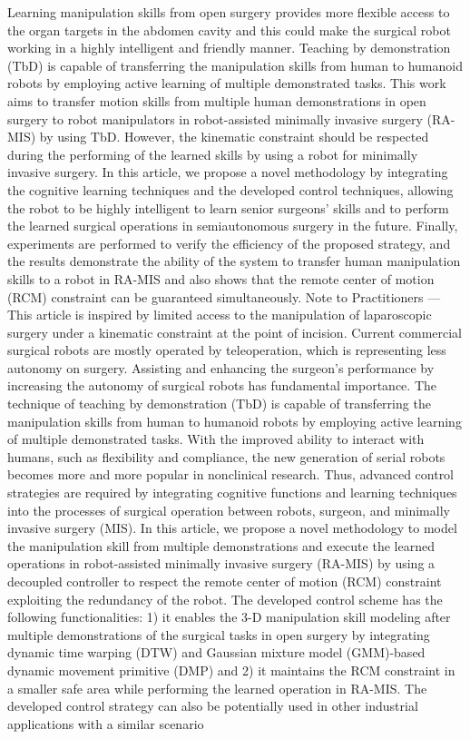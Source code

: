 \documentclass[conference]{IEEEtran}
\begin{document}
Learning manipulation skills from open surgery provides more flexible access to the organ targets in the abdomen cavity and this could make the surgical robot working in a highly intelligent and friendly manner. Teaching by demonstration (TbD) is capable of transferring the manipulation skills from human to humanoid robots by employing active learning of multiple demonstrated tasks. This work aims to transfer motion skills from multiple human demonstrations in open surgery to robot manipulators in robot-assisted minimally invasive surgery (RA-MIS) by using TbD. However, the kinematic constraint should be respected during the performing of the learned skills by using a robot for minimally invasive surgery. In this article, we propose a novel methodology by integrating the cognitive learning techniques and the developed control techniques, allowing the robot to be highly intelligent to learn senior surgeons’ skills and to perform the learned surgical operations in semiautonomous surgery in the future. Finally, experiments are performed to verify the efficiency of the proposed strategy, and the results demonstrate the ability of the system to transfer human manipulation skills to a robot in RA-MIS and also shows that the remote center of motion (RCM) constraint can be guaranteed simultaneously. Note to Practitioners —This article is inspired by limited access to the manipulation of laparoscopic surgery under a kinematic constraint at the point of incision. Current commercial surgical robots are mostly operated by teleoperation, which is representing less autonomy on surgery. Assisting and enhancing the surgeon’s performance by increasing the autonomy of surgical robots has fundamental importance. The technique of teaching by demonstration (TbD) is capable of transferring the manipulation skills from human to humanoid robots by employing active learning of multiple demonstrated tasks. With the improved ability to interact with humans, such as flexibility and compliance, the new generation of serial robots becomes more and more popular in nonclinical research. Thus, advanced control strategies are required by integrating cognitive functions and learning techniques into the processes of surgical operation between robots, surgeon, and minimally invasive surgery (MIS). In this article, we propose a novel methodology to model the manipulation skill from multiple demonstrations and execute the learned operations in robot-assisted minimally invasive surgery (RA-MIS) by using a decoupled controller to respect the remote center of motion (RCM) constraint exploiting the redundancy of the robot. The developed control scheme has the following functionalities: 1) it enables the 3-D manipulation skill modeling after multiple demonstrations of the surgical tasks in open surgery by integrating dynamic time warping (DTW) and Gaussian mixture model (GMM)-based dynamic movement primitive (DMP) and 2) it maintains the RCM constraint in a smaller safe area while performing the learned operation in RA-MIS. The developed control strategy can also be potentially used in other industrial applications with a similar scenario
\end{document}
